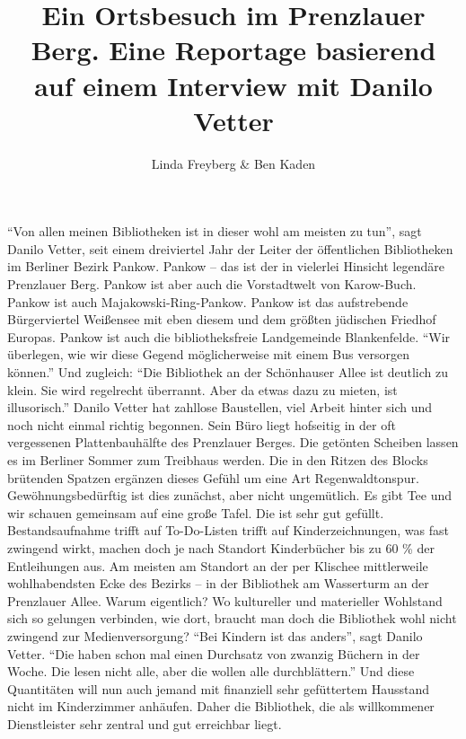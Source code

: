 \documentclass[a4paper,
fontsize=11pt,
oneside,
numbers=noperiodatend,
parskip=half-,
bibliography=totoc,
final
]{scrartcl}
\title{\LARGE{Ein Ortsbesuch im Prenzlauer Berg. Eine Reportage basierend auf einem Interview mit Danilo Vetter}} %
\author{Linda Freyberg \& Ben Kaden} %
\date{}
\begin{document}
\maketitle
\thispagestyle{fancyplain} 


\enquote{Von allen meinen Bibliotheken ist in dieser wohl am meisten zu
tun}, sagt Danilo Vetter, seit einem dreiviertel Jahr der Leiter der
öffentlichen Bibliotheken im Berliner Bezirk Pankow. Pankow -- das ist
der in vielerlei Hinsicht legendäre Prenzlauer Berg. Pankow ist aber
auch die Vorstadtwelt von Karow-Buch. Pankow ist auch
Majakowski-Ring-Pankow. Pankow ist das aufstrebende Bürgerviertel
Weißensee mit eben diesem und dem größten jüdischen Friedhof Europas.
Pankow ist auch die bibliotheksfreie Landgemeinde Blankenfelde.
\enquote{Wir überlegen, wie wir diese Gegend möglicherweise mit einem
Bus versorgen können.} Und zugleich: \enquote{Die Bibliothek an der
Schönhauser Allee ist deutlich zu klein. Sie wird regelrecht überrannt.
Aber da etwas dazu zu mieten, ist illusorisch.} Danilo Vetter hat
zahllose Baustellen, viel Arbeit hinter sich und noch nicht einmal
richtig begonnen. Sein Büro liegt hofseitig in der oft vergessenen
Plattenbauhälfte des Prenzlauer Berges. Die getönten Scheiben lassen es
im Berliner Sommer zum Treibhaus werden. Die in den Ritzen des Blocks
brütenden Spatzen ergänzen dieses Gefühl um eine Art Regenwaldtonspur.
Gewöhnungsbedürftig ist dies zunächst, aber nicht ungemütlich. Es gibt
Tee und wir schauen gemeinsam auf eine große Tafel. Die ist sehr gut
gefüllt. Bestandsaufnahme trifft auf To-Do-Listen trifft auf
Kinderzeichnungen, was fast zwingend wirkt, machen doch je nach Standort
Kinderbücher bis zu 60 \% der Entleihungen aus. Am meisten am Standort
an der per Klischee mittlerweile wohlhabendsten Ecke des Bezirks -- in
der Bibliothek am Wasserturm an der Prenzlauer Allee. Warum eigentlich?
Wo kultureller und materieller Wohlstand sich so gelungen verbinden, wie
dort, braucht man doch die Bibliothek wohl nicht zwingend zur
Medienversorgung? \enquote{Bei Kindern ist das anders}, sagt Danilo
Vetter. \enquote{Die haben schon mal einen Durchsatz von zwanzig Büchern
in der Woche. Die lesen nicht alle, aber die wollen alle durchblättern.}
Und diese Quantitäten will nun auch jemand mit finanziell sehr
gefüttertem Hausstand nicht im Kinderzimmer anhäufen. Daher die
Bibliothek, die als willkommener Dienstleister sehr zentral und gut
erreichbar liegt.
\end{document}
